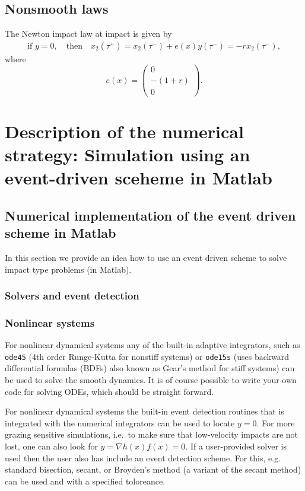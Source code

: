 \documentclass[10pt]{article}
\begin{document}
\subsection{Nonsmooth laws}

The Newton impact law at impact is given by
\begin{eqnarray}
  \label{eq:18}
  \text{if } y=0,\quad \text{then} \quad  x_2(\tau^+)= x_2(\tau^-) + e(x)\dot y(\tau^-)= -rx_2(\tau^-),
\end{eqnarray}
where
\begin{equation}
  \label{eq:18b}
  e(x) =  \left(\begin{array}{c} 0 \\ -(1+r) \\ 0\end{array}\right).
\end{equation}
\section{Description of the numerical strategy: Simulation using an event-driven sceheme in Matlab}
\label{Sec:Simulation}


\subsection{Numerical implementation of the event driven scheme in Matlab}

In this section we provide an idea how to use an event driven scheme to solve impact type problems (in Matlab).
\subsubsection{Solvers and event detection} \label{sec:solvers}
\subsubsection*{Nonlinear systems}
For nonlinear dynamical systems any of the built-in adaptive integrators, such as \verb|ode45| (4th order Runge-Kutta for nonstiff systems) or \verb|ode15s| (uses backward differential formulas (BDFs) also known as Gear's method for stiff systems) can be used to solve the smooth dynamics. It is of course possible to write your own code for solving ODEs, which should be straight forward. 

For nonlinear dynamical systems the built-in event detection routines that is integrated with the numerical integrators can be used to locate $y=0$. For more grazing sensitive simulations, i.e.~to make sure that low-velocity impacts are not lost, one can also look for $\dot{y} = \nabla h(x)f(x)=0$. If a user-provided solver is used then the user also has include an event detection scheme. For this, e.g. standard bisection, secant, or Broyden's method (a variant of the secant method) can be used and with a specified toloreance.
   
\end{document}
